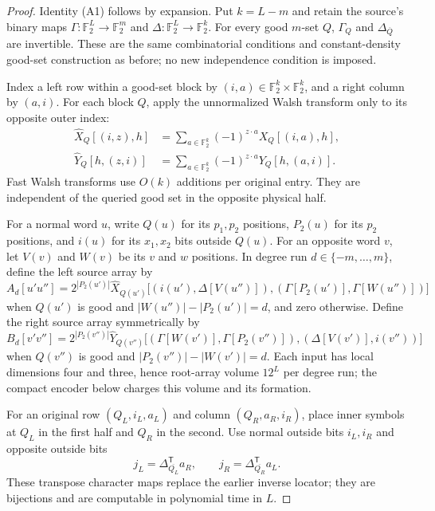 \documentclass[11pt]{article}
\begin{document}
\begin{proof}
Identity (A1) follows by expansion. Put $k=L-m$ and retain the source's
binary maps $\Gamma:\mathbb F_2^L\to\mathbb F_2^m$ and
$\Delta:\mathbb F_2^L\to\mathbb F_2^k$. For every good $m$-set $Q$,
$\Gamma_Q$ and $\Delta_{\overline Q}$ are invertible. These are the
same combinatorial conditions and constant-density good-set construction
as before; no new independence condition is imposed.

Index a left row within a good-set block by $(i,a)\in
\mathbb F_2^k\times\mathbb F_2^k$, and a right column by $(a,i)$.
For each block $Q$, apply the unnormalized Walsh transform only to its
opposite outer index:
\begin{align*}
 \widehat X_Q[(i,z),h]
 &=\sum_{a\in\mathbb F_2^k}(-1)^{z\cdot a}X_Q[(i,a),h],\\
 \widehat Y_Q[h,(z,i)]
 &=\sum_{a\in\mathbb F_2^k}(-1)^{z\cdot a}Y_Q[h,(a,i)]. \tag{A2}
\end{align*}
Fast Walsh transforms use $O(k)$ additions per original entry. They
are independent of the queried good set in the opposite physical half.

For a normal word $u$, write $Q(u)$ for its $p_1,p_2$ positions,
$P_2(u)$ for its $p_2$ positions, and $i(u)$ for its $x_1,x_2$ bits
outside $Q(u)$. For an opposite word $v$, let $V(v)$ and $W(v)$ be its
$v$ and $w$ positions. In degree run $d\in\{-m,\ldots,m\}$, define
the left source array by
\[
 A_d[u'u'']=2^{|P_2(u')|}
 \widehat X_{Q(u')}\bigl[
 (i(u'),\Delta[V(u'')]),
 (\Gamma[P_2(u')],\Gamma[W(u'')])\bigr]                \tag{A3}
\]
when $Q(u')$ is good and $|W(u'')|-|P_2(u')|=d$, and zero otherwise.
Define the right source array symmetrically by
\[
 B_d[v'v'']=2^{|P_2(v'')|}
 \widehat Y_{Q(v'')}\bigl[
 (\Gamma[W(v')],\Gamma[P_2(v'')]),
 (\Delta[V(v')],i(v''))\bigr]                         \tag{A4}
\]
when $Q(v'')$ is good and $|P_2(v'')|-|W(v')|=d$.
Each input has local dimensions four and three, hence root-array
volume $12^L$ per degree run; the compact encoder below charges this
volume and its formation.

For an original row $(Q_L,i_L,a_L)$ and column $(Q_R,a_R,i_R)$,
place inner symbols at $Q_L$ in the first half and $Q_R$ in the second.
Use normal outside bits $i_L,i_R$ and opposite outside bits
\[
 j_L=\Delta_{\overline{Q_L}}^{\mathsf T}a_R,
 \qquad j_R=\Delta_{\overline{Q_R}}^{\mathsf T}a_L.     \tag{A5}
\]
These transpose character maps replace the earlier inverse locator;
they are bijections and are computable in polynomial time in $L$.


\end{proof}
\end{document}
